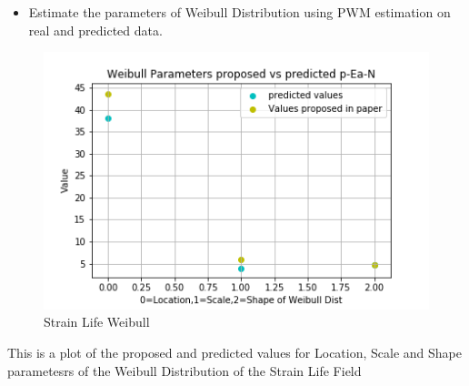 \documentclass[11pt]{article}
\providecommand{\tightlist}{%
      \setlength{\itemsep}{0pt}\setlength{\parskip}{0pt}}
\begin{document}
\begin{itemize}
\tightlist
\item
  Estimate the parameters of Weibull Distribution using PWM estimation
  on real and predicted data.
\end{itemize}

\begin{figure}
\centering
\includegraphics{images/PWMPlotstrain.png}
\caption{Strain Life Weibull}
\end{figure}

This is a plot of the proposed and predicted values for Location, Scale
and Shape parametesrs of the Weibull Distribution of the Strain Life
Field
\end{document}
